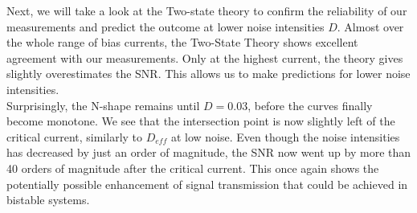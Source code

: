 \documentclass[12pt,a4paper]{article}
\begin{document}
Next, we will take a look at the Two-state theory to confirm the reliability of our measurements and predict the outcome at lower noise intensities $D$.
Almost over the whole range of bias currents, the Two-State Theory shows excellent agreement with our measurements. Only at the highest current, the theory gives slightly overestimates the SNR. This allows us to make predictions for lower noise intensities.\\
Surprisingly, the N-shape remains until $D=0.03$, before the curves finally become monotone. We see that the intersection point is now slightly left of the critical current, similarly to $D_{eff}$ at low noise. Even though the noise intensities has decreased by just an order of magnitude, the SNR now went up by more than 40 orders of magnitude after the critical current. This once again shows the potentially possible enhancement of signal transmission that could be achieved in bistable systems.
\end{document}
